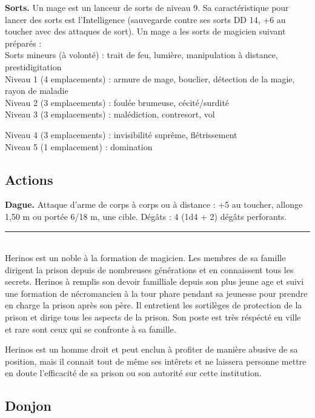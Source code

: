 \begin{figure*}[tb!]
{\begin{minipage}[c]{.45\linewidth}
    {\bfseries Sorts.} Un mage est un lanceur de sorts de niveau 9. Sa caractéristique pour lancer 
               des sorts est l'Intelligence (sauvegarde contre ses sorts DD 14, +6 au toucher avec des 
               attaques de sort). Un mage a les sorts de magicien suivant préparés :\\
Sorts mineurs (à volonté) : trait de feu, lumière, manipulation à distance, prestidigitation\\
Niveau 1 (4 emplacements) : armure de mage, bouclier, détection de la magie, rayon de maladie\\
Niveau 2 (3 emplacements) : foulée brumeuse, cécité/surdité\\
Niveau 3 (3 emplacements) : malédiction, contresort, vol
 \end{minipage}
  \hspace{4pt}
 \begin{minipage}[c]{.45\linewidth}
Niveau 4 (3 emplacements) : invisibilité suprême, flétrissement\\
Niveau 5 (1 emplacement) : domination
 \vspace{-10pt}
    \subsection*{Actions}
    {\bfseries Dague.} Attaque d'arme de corps à corps ou à distance : +5 au toucher, allonge 1,50 m ou portée 6/18 m,
         une cible. Dégâts : 4 (1d4 + 2) dégâts perforants.
   \noindent\rule{\textwidth}{1pt} \\
Herinos est un noble à la formation de magicien. Les membres de sa famille
dirigent la prison depuis de nombreuses générations et en connaissent tous les 
secrets. Herinos à remplis son devoir familliale depuis son plus jeune age et
suivi une formation de nécromancien à la tour phare pendant sa jeunesse pour 
prendre en charge la prison après son père. Il entretient les sortilèges de 
protection de la prison et dirige tous les aspects de la prison. Son poste est 
très réspécté en ville et rare sont ceux qui se confronte à sa famille. 

Herinos est un homme droit et peut enclun à profiter de manière abusive de
sa position, mais il connait tout de même ses intêrets et ne laissera personne
mettre en doute l'efficacité de sa prison ou son autorité sur cette institution.
 \end{minipage}
}%
\end{figure*}

\subsection{Donjon}

